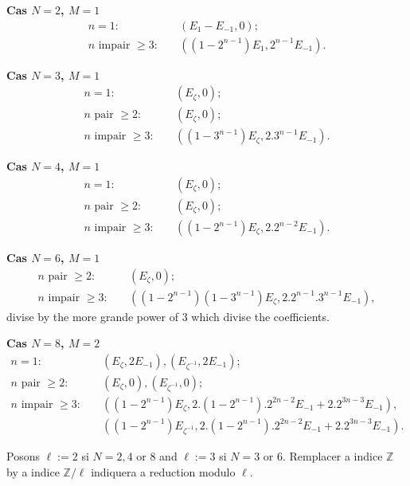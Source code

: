 \documentclass[11pt,a4paper]{article}
\theoremstyle{plain}
\theoremstyle{definition}
\newcommand{\Z}{\mathbb{Z}}
\begin{document}
\medskip
\noindent\textbf{Cas $N=2$, $M=1$}
\begin{align*}
n=1: &\quad (E_1 - E_{-1}, 0); \\
n \text{ impair } \geq 3: &\quad ((1-2^{n-1})E_1, 2^{n-1}E_{-1}).
\end{align*}

\medskip
\noindent\textbf{Cas $N=3$, $M=1$}
\begin{align*}
n=1: &\quad (E_\zeta, 0); \\
n \text{ pair } \geq 2: &\quad (E_\zeta, 0); \\
n \text{ impair } \geq 3: &\quad ((1-3^{n-1})E_\zeta, 2.3^{n-1}E_{-1}).
\end{align*}

\medskip
\noindent\textbf{Cas $N=4$, $M=1$}
\begin{align*}
n=1: &\quad (E_\zeta, 0); \\
n \text{ pair } \geq 2: &\quad (E_\zeta, 0); \\
n \text{ impair } \geq 3: &\quad ((1-2^{n-1})E_\zeta, 2.2^{n-2}E_{-1}).
\end{align*}

\medskip
\noindent\textbf{Cas $N=6$, $M=1$}
\begin{align*}
n \text{ pair } \geq 2: &\quad (E_\zeta, 0); \\
n \text{ impair } \geq 3: &\quad ((1-2^{n-1})(1-3^{n-1})E_\zeta, 2.2^{n-1}.3^{n-1}E_{-1}),
\end{align*}
divise by the more grande power of $3$ which divise the coefficients.

\medskip
\noindent\textbf{Cas $N=8$, $M=2$}
\begin{align*}
n=1: &\quad (E_\zeta, 2E_{-1}), (E_{\zeta^{-1}}, 2E_{-1}); \\
n \text{ pair } \geq 2: &\quad (E_\zeta, 0), (E_{\zeta^{-1}}, 0); \\
n \text{ impair } \geq 3: &\quad ((1-2^{n-1})E_\zeta, 2.(1-2^{n-1}).2^{2n-2}E_{-1} + 2.2^{3n-3}E_{-1}), \\
&\quad ((1-2^{n-1})E_{\zeta^{-1}}, 2.(1-2^{n-1}).2^{2n-2}E_{-1} + 2.2^{3n-3}E_{-1}).
\end{align*}

Posons $\ell := 2$ si $N=2,4$ or $8$ and $\ell := 3$ si $N=3$ or $6$. Remplacer a indice $\Z$ by a indice $\Z/\ell$ indiquera a reduction modulo $\ell$.
\end{document}
